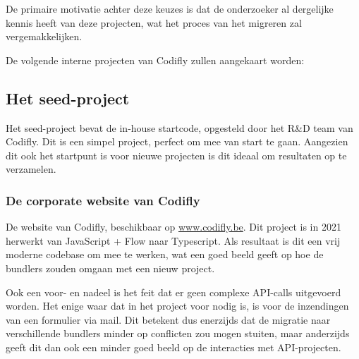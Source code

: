 De primaire motivatie achter deze keuzes is dat de onderzoeker al dergelijke kennis heeft van deze projecten, wat het proces van het migreren zal vergemakkelijken.

De volgende interne projecten van Codifly zullen aangekaart worden:

\subsection{Het seed-project}

Het seed-project bevat de in-house startcode, opgesteld door het R\&D team van Codifly. Dit is een simpel project, perfect om mee van start te gaan. Aangezien dit ook het startpunt is voor nieuwe projecten is dit ideaal om resultaten op te verzamelen.

\subsubsection{De corporate website van Codifly}

De website van Codifly, beschikbaar op \href{https://www.codifly.be}{www.codifly.be}. Dit project is in 2021 herwerkt van JavaScript + Flow naar Typescript. Als resultaat is dit een vrij moderne codebase om mee te werken, wat een goed beeld geeft op hoe de bundlers zouden omgaan met een nieuw project.

Ook een voor- en nadeel is het feit dat er geen complexe API-calls uitgevoerd worden. Het enige waar dat in het project voor nodig is, is voor de inzendingen van een formulier via mail. Dit betekent dus enerzijds dat de migratie naar verschillende bundlers minder op conflicten zou mogen stuiten, maar anderzijds geeft dit dan ook een minder goed beeld op de interacties met API-projecten.

